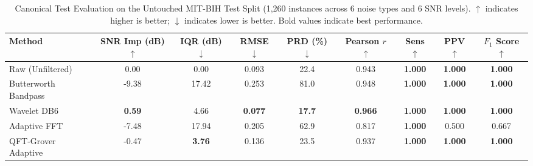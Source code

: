 \begin{table}[t]
\centering
\caption{Canonical Test Evaluation on the Untouched MIT-BIH Test Split (1,260 instances across 6 noise types and 6 SNR levels). $\uparrow$ indicates higher is better; $\downarrow$ indicates lower is better. Bold values indicate best performance.}
\label{tab:main_results}
\begin{tabular}{lcccccccc}
\hline
\textbf{Method} & \textbf{SNR Imp (dB) $\uparrow$} & \textbf{IQR (dB) $\downarrow$} & \textbf{RMSE $\downarrow$} & \textbf{PRD (\%) $\downarrow$} & \textbf{Pearson $r$ $\uparrow$} & \textbf{Sens $\uparrow$} & \textbf{PPV $\uparrow$} & \textbf{$F_1$ Score $\uparrow$} \\
\hline
Raw (Unfiltered) & 0.00 & 0.00 & 0.093 & 22.4 & 0.943 & \textbf{1.000} & \textbf{1.000} & \textbf{1.000} \\
Butterworth Bandpass & -9.38 & 17.42 & 0.253 & 81.0 & 0.948 & \textbf{1.000} & \textbf{1.000} & \textbf{1.000} \\
Wavelet DB6 & \textbf{0.59} & 4.66 & \textbf{0.077} & \textbf{17.7} & \textbf{0.966} & \textbf{1.000} & \textbf{1.000} & \textbf{1.000} \\
Adaptive FFT & -7.48 & 17.94 & 0.205 & 62.9 & 0.817 & \textbf{1.000} & 0.500 & 0.667 \\
QFT-Grover Adaptive & -0.47 & \textbf{3.76} & 0.136 & 23.5 & 0.937 & \textbf{1.000} & \textbf{1.000} & \textbf{1.000} \\
\hline
\end{tabular}
\end{table}
